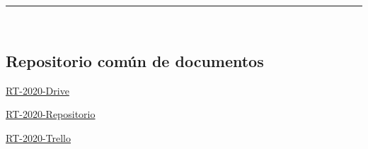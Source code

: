 \documentclass{article}
\begin{document}
\rule{0.8\textwidth}{.8pt}\\

\subsection*{Repositorio común de documentos}
\href{https://drive.google.com/open?id=13f9jp3Oli6AQF1Ap8VhoEKFXTPULumos}{RT-2020-Drive}

\href{https://github.com/mildewyPrawn/CafeCiencias}{RT-2020-Repositorio}

\href{https://trello.com/b/rwdAGuSi/cafeciencias}{RT-2020-Trello}
\end{document}

